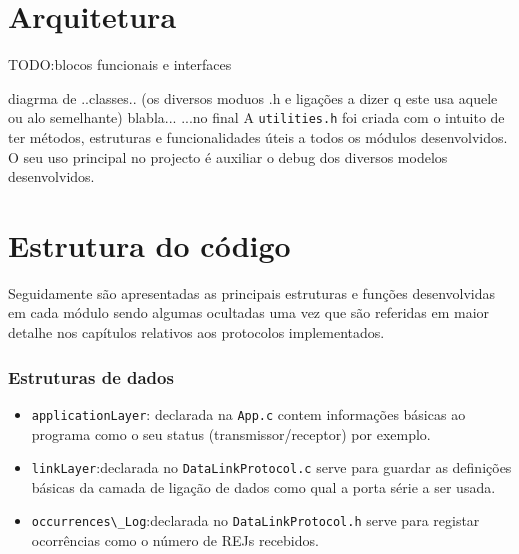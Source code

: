 \documentclass[11pt,a4paper,reqno]{report}
\numberwithin{equation}{section}
\begin{document}
	
\chapter{Arquitetura}

TODO:blocos funcionais e interfaces

diagrma de ..classes.. (os diversos moduos .h e ligações a dizer q este usa aquele ou alo semelhante)
blabla...
...no final
A \verb|utilities.h| foi criada com o intuito de ter métodos, estruturas e funcionalidades úteis a todos os módulos desenvolvidos. O seu uso principal no projecto é auxiliar o debug dos diversos modelos desenvolvidos.

\chapter{Estrutura do código}

Seguidamente são apresentadas as principais estruturas e funções desenvolvidas em cada módulo sendo algumas ocultadas uma vez que são referidas em maior detalhe nos capítulos relativos aos protocolos implementados.

\subsection{Estruturas de dados}
\begin{itemize}
\item \verb|applicationLayer|: declarada na \verb|App.c| contem informações básicas ao programa como o seu status (transmissor/receptor) por exemplo. 	
\item \verb|linkLayer|:declarada no \verb|DataLinkProtocol.c| serve para guardar as definições básicas da camada de ligação de dados como qual a porta série a ser usada.	
\item \verb|occurrences\_Log|:declarada no \verb|DataLinkProtocol.h| serve para registar ocorrências como o número de REJs recebidos.	
\end{itemize}
\end{document}

